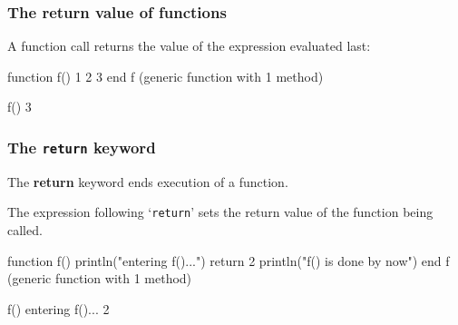 \documentclass[english,serif,mathserif,xcolor=pdftex,dvipsnames,table]{beamer}
\begin{document}






\begin{frame}[fragile]
  \frametitle{The return value of functions}
  A function call returns the value of the expression evaluated last:
\begin{semiverbatim}
\julia function f()
       1
       2
       3
       end
f (generic function with 1 method)

\julia f()
3
\end{semiverbatim}
\end{frame}

\begin{frame}[fragile]
  \frametitle{The \texttt{return} keyword}

  The {\ttfamily\bfseries return} keyword ends execution of a function.

  \+ The expression following `\texttt{return}' sets the return value
  of the function being called.

  \+
\begin{semiverbatim}
\julia function f()
       println("entering f()...")
       return 2
       println("f() is done by now")
       end
f (generic function with 1 method)

\julia f()
entering f()...
2
\end{semiverbatim}
\end{frame}
\end{document}
